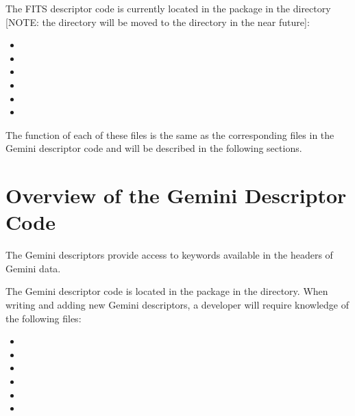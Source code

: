 \documentclass[letterpaper,10pt,english]{sphinxmanual}
\begin{document}
The FITS descriptor code is currently located in the  package
in the  directory {[}NOTE: the
 directory will be moved to the  directory in
the near future{]}:
\begin{itemize}
\item {} 

\item {} 

\item {} 

\item {} 

\item {} 

\item {} 

\end{itemize}

The function of each of these files is the same as the corresponding files in
the Gemini descriptor code and will be described in the following sections.


\section{Overview of the Gemini Descriptor Code}
\label{coding:overview-of-the-gemini-descriptor-code}
The Gemini descriptors provide access to keywords available in the headers of
Gemini data.

The Gemini descriptor code is located in the  package in the
 directory. When writing and
adding new Gemini descriptors, a developer will require knowledge of the
following files:
\begin{itemize}
\item {} 

\item {} 

\item {} 

\item {} 

\item {} 

\item {} 

\end{itemize}
\end{document}

